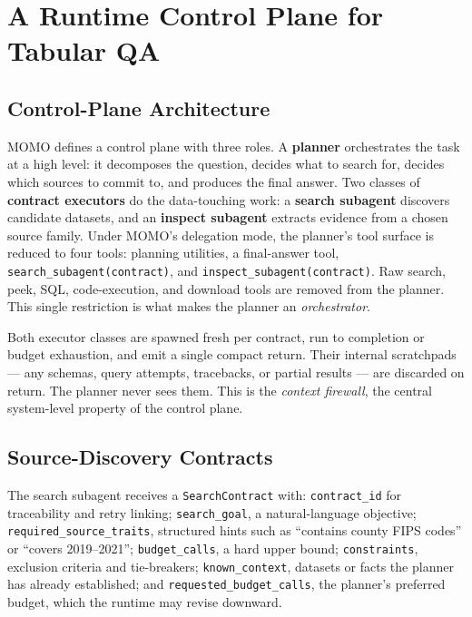 \section{A Runtime Control Plane for Tabular QA}
\label{sec:architecture}

\subsection{Control-Plane Architecture}

MOMO defines a control plane with three roles. A \textbf{planner} orchestrates the task at a high level: it decomposes the question, decides what to search for, decides which sources to commit to, and produces the final answer. Two classes of \textbf{contract executors} do the data-touching work: a \textbf{search subagent} discovers candidate datasets, and an \textbf{inspect subagent} extracts evidence from a chosen source family. Under MOMO's delegation mode, the planner's tool surface is reduced to four tools: planning utilities, a final-answer tool, \texttt{search\_subagent(contract)}, and \texttt{inspect\_subagent(contract)}. Raw search, peek, SQL, code-execution, and download tools are removed from the planner. This single restriction is what makes the planner an \emph{orchestrator}.

Both executor classes are spawned fresh per contract, run to completion or budget exhaustion, and emit a single compact return. Their internal scratchpads --- any schemas, query attempts, tracebacks, or partial results --- are discarded on return. The planner never sees them. This is the \emph{context firewall}, the central system-level property of the control plane.

\subsection{Source-Discovery Contracts}

The search subagent receives a \texttt{SearchContract} with: \texttt{contract\_id} for traceability and retry linking; \texttt{search\_goal}, a natural-language objective; \texttt{required\_source\_traits}, structured hints such as ``contains county FIPS codes'' or ``covers 2019--2021''; \texttt{budget\_calls}, a hard upper bound; \texttt{constraints}, exclusion criteria and tie-breakers; \texttt{known\_context}, datasets or facts the planner has already established; and \texttt{requested\_budget\_calls}, the planner's preferred budget, which the runtime may revise downward.

